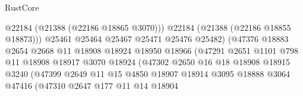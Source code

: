 \begin{lexlean}{RustCore}
\begin{coremodule}
                                            @22184
                                            (@21388 (@22186 @18865 @3070)))
                                          @22184
                                          (@21388 (@22186 @18855 @18873)))
                                        @25461
                                        @25464
                                        @25467
                                        @25471
                                        @25476
                                        @25482)
                                      (@47376
                                        @18883
                                        @2654
                                        @2668
                                        @11
                                        @18908
                                        @18924
                                        @18950
                                        @18966
                                        (@47291
                                          @2651
                                          @1101
                                          @798
                                          @11
                                          @18908
                                          @18917
                                          @3070
                                          @18924
                                          (@47302
                                            @2650
                                            @16
                                            @18
                                            @18908
                                            @18915
                                            @3240
                                            (@47399
                                              @2649
                                              @11
                                              @15
                                              @4850
                                              @18907
                                              @18914
                                              @3095
                                              @18888
                                              @3064
                                              @47416
                                              (@47310
                                                @2647
                                                @177
                                                @11
                                                @14
                                                @18904

\end{coremodule}
\end{lexlean}
